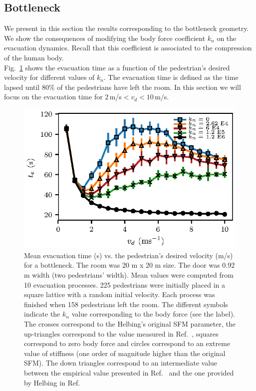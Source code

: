 \documentclass[preprint,12pt]{elsarticle}
\begin{document}
\subsection{\label{bottleneck} Bottleneck}


We present in this section the results corresponding to the bottleneck geometry. 
We show the consequences of modifying the body force coefficient $k_n$ on the 
evacuation dynamics. Recall that this coefficient is associated 
to the compression of the human body. \\

Fig.~\ref{vd_vs_te} shows the evacuation time as a function of the pedestrian's 
desired velocity for different values of $k_n$. The evacuation 
time is defined as the time lapsed until 80\% of the pedestrians have 
left the room. In this section we will focus on the evacuation time for 
$2\,$m/s$<v_d<10\,$m/s.\\


\begin{figure}[htbp!]
\centering
\includegraphics[width=0.7\columnwidth]
{./vd_vs_te_N225.eps}
\caption{\label{vd_vs_te}Mean evacuation time (s) vs. the pedestrian’s desired  
velocity (m/s) for a bottleneck. The room was 20 m x 20 m size. The door was 
0.92 m width (two pedestrians' width). Mean values were computed from 10 evacuation processes. 225 
pedestrians were initially placed in a square lattice with a random initial 
velocity. Each process was finished when 158 pedestrians left the room. The 
different symbols indicate the $k_n$ value corresponding to the body force (see 
the label). The crosses correspond to the Helbing's original SFM parameter, the 
up-triangles correspond to the value measured in 
Ref.~\cite{melvin1988aatd}, squares correspond 
to zero body force and circles correspond to an extreme value of stiffness (one 
order of magnitude higher than the original SFM). The 
 down triangles correspond to an intermediate value between the empirical value 
presented in Ref.~\cite{melvin1988aatd} and the one provided by Helbing in 
Ref.~\cite{helbing_2000} }
\end{figure}
\end{document}
